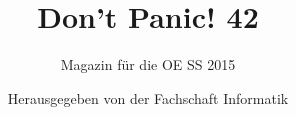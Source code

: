 \begin{titlepage}

\thispagestyle{empty}
\title{\Huge{Don't Panic! 42}}
\author{Magazin für die OE SS 2015}
\date{Herausgegeben von der Fachschaft Informatik}

\setcounter{tocdepth}{1} %


%

\maketitle
\newpage
\end{titlepage}

